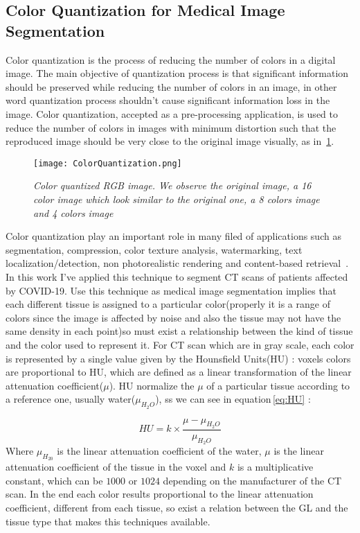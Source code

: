 \documentclass{standalone}
\begin{document}
	\subsection{Color Quantization for Medical Image Segmentation}
	

	Color quantization is the process of reducing the number of colors in a digital image. The main objective of quantization process is that 
	significant information should be preserved while reducing the number of colors in an image, in other word quantization process shouldn’t cause 
	significant information loss in the image. 
	Color quantization, accepted as a pre-processing application, is used to reduce the number of colors in images with minimum distortion such that the 
	reproduced image should be very close to the original image visually, as in \figurename\,\ref{fig:ColorQuantization}. 

	\begin{figure}[h!]
		
		\centering
			\texttt{[image: ColorQuantization.png]}
		\label{fig:ColorQuantization}\caption{\textit{Color quantized RGB image. We observe the original image, a 16 color image which look similar to the original one, a 8 colors image and 4 colors image}}
	\end{figure}

	Color quantization play an important role in many filed of applications such as segmentation, compression, color texture analysis, watermarking, 
	text localization/detection, non photorealistic rendering and content-based retrieval~\cite{ART:Ozturk}.\\
	
	
	In this work I've applied this technique to segment CT scans of patients affected by COVID-19. Use this technique as medical image segmentation implies that each different tissue is assigned to a particular color(properly it is a range of colors since the image is affected by noise and also the tissue may not have the same density in each point)so must exist a relationship between the kind of tissue and the color used to represent it. 
	For CT scan which are in gray scale, each color is represented by a single value given by the Hounsfield Units(HU) : voxels colors are proportional to HU, which are defined as a linear transformation of the linear attenuation coefficient($\mu$). HU normalize the $\mu$ of a particular tissue according to a reference one, usually water($\mu_{H_2 O}$), ss we can see in equation\,\ref{eq:HU} : 
	
	\begin{equation}\label{eq:HU}
		HU = k\times\frac{\mu - \mu_{H_2 O}}{\mu_{H_2 O}}
	\end{equation}
	Where $\mu_{H_20}$ is the linear attenuation coefficient of the water, $\mu$ is the linear attenuation coefficient of the tissue in the voxel and $k$ is a multiplicative constant, which can be $1000$ or $1024$ depending on the manufacturer of the CT scan.	
	In the end each color results proportional to the linear attenuation coefficient, different from each tissue, so exist a relation between the GL and the tissue type that makes this techniques available. \\
	
\end{document}
